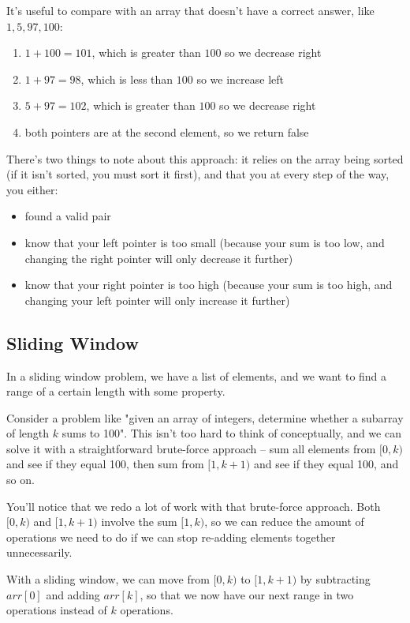 It's useful to compare with an array that doesn't have a correct answer, like $1,5,97,100$:
\begin{enumerate}
\item $1 + 100 = 101$, which is greater than $100$ so we decrease right
\item $1 + 97 = 98$, which is less than $100$ so we increase left
\item $5 + 97 = 102$, which is greater than $100$ so we decrease right
\item both pointers are at the second element, so we return false
\end{enumerate}

There's two things to note about this approach: it relies on the array being sorted (if it isn't sorted, you must sort it first), and that you at every step of the way, you either:
\begin{itemize}
\item found a valid pair
\item know that your left pointer is too small (because your sum is too low, and changing the right pointer will only decrease it further)
\item know that your right pointer is too high (because your sum is too high, and changing your left pointer will only increase it further)
\end{itemize}

\subsection{Sliding Window}

In a sliding window problem, we have a list of elements, and we want to find a range of a certain length with some property.

Consider a problem like "given an array of integers, determine whether a subarray of length $k$ sums to 100". This isn't too hard to think of conceptually, and we can solve it with a straightforward brute-force approach -- sum all elements from $[0,k)$ and see if they equal 100, then sum from $[1,k+1)$ and see if they equal 100, and so on.

You'll notice that we redo a lot of work with that brute-force approach. Both $[0,k)$ and $[1,k+1)$ involve the sum $[1,k)$, so we can reduce the amount of operations we need to do if we can stop re-adding elements together unnecessarily.

With a sliding window, we can move from $[0,k)$ to $[1,k+1)$ by subtracting $arr[0]$ and adding $arr[k]$, so that we now have our next range in two operations instead of $k$ operations.

